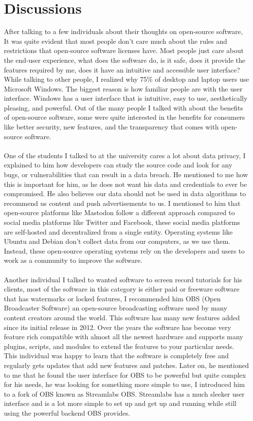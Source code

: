\documentclass{article}
\begin{document}
\pagebreak

\section*{Discussions}
After talking to a few individuals about their thoughts on open-source software, It was quite evident that most people don't care much about the rules and restrictions that open-source software licenses have. Most people just care about the end-user experience, what does the software do, is it safe, does it provide the features required by me, does it have an intuitive and accessible user interface? While talking to other people, I realized why 75\% of desktop and laptop users use Microsoft Windows. The biggest reason is how familiar people are with the user interface. Windows has a user interface that is intuitive, easy to use, aesthetically pleasing, and powerful. Out of the many people I talked with about the benefits of open-source software, some were quite interested in the benefits for consumers like better security, new features, and the transparency that comes with open-source software.
\\\\
One of the students I talked to at the university cares a lot about data privacy, I explained to him how developers can study the source code and look for any bugs, or vulnerabilities that can result in a data breach. He mentioned to me how this is important for him, as he does not want his data and credentials to ever be compromised. He also believes our data should not be used in data algorithms to recommend us content and push advertisements to us. I mentioned to him that open-source platforms like Mastodon follow a different approach compared to social media platforms like Twitter and Facebook, these social media platforms are self-hosted and decentralized from a single entity. Operating systems like Ubuntu and Debian don’t collect data from our computers, as we use them. Instead, these open-source operating systems rely on the developers and users to work as a community to improve the software.
\\\\
Another individual I talked to wanted software to screen record tutorials for his clients, most of the software in this category is either paid or freeware software that has watermarks or locked features, I recommended him OBS (Open Broadcaster Software) an open-source broadcasting software used by many content creators around the world. This software has many new features added since its initial release in 2012. Over the years the software has become very feature rich compatible with almost all the newest hardware and supports many plugins, scripts, and modules to extend the features to your particular needs. This individual was happy to learn that the software is completely free and regularly gets updates that add new features and patches. Later on, he mentioned to me that he found the user interface for OBS to be powerful but quite complex for his needs, he was looking for something more simple to use, I introduced him to a fork of OBS known as Streamlabs OBS. Streamlabs has a much sleeker user interface and is a lot more simple to set up and get up and running while still using the powerful backend OBS provides.
\end{document}
